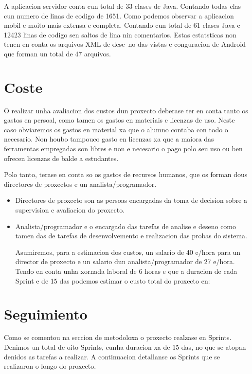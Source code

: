 A aplicacion servidor conta cun total de 33 clases de Java. Contando todas elas cun
numero de linas de codigo de 1651.
Como podemos observar a aplicacion mobil e moito mais extensa e completa. Contando
cun total de 61 clases Java e 12423 linas de codigo sen saltos de lina nin comentarios. Estas
estatsticas non tenen en conta os arquivos XML de dese~no das vistas e conguracion de
Android que forman un total de 47 arquivos.


\section{Coste}
O
realizar unha avaliacion dos custos dun proxecto deberase ter en conta tanto os gastos
en persoal, como tamen os gastos en materiais e licenzas de uso. Neste caso obviaremos os
gastos en material xa que o alumno contaba con todo o necesario. Non houbo tampouco
gasto en licenzas xa que a maiora das ferramentas empregadas son libres e non e necesario
o pago polo seu uso ou ben ofrecen licenzas de balde a estudantes.


Polo tanto, terase en conta so os gastos de recursos humanos, que os forman dous
directores de proxectos e un analista/programador.


\begin{itemize}
\item Directores de proxecto son as persoas encargadas da toma de decision sobre a
supervision e avaliacion do proxecto.

\item Analista/programador e o encargado das tarefas de analise e deseno como tamen
das de tarefas de desenvolvemento e realizacion das probas do sistema.


Asumiremos, para a estimacion dos custos, un salario de 40 e/hora para un director
de proxecto e un salario dun analista/programador de 27 e/hora. Tendo en conta unha
xornada laboral de 6 horas e que a duracion de cada Sprint e de 15 das podemos estimar
o custo total do proxecto en:
\end{itemize}
\section{Seguimiento}
Como se comentou na seccion de metodoloxa o proxecto realzase en Sprints. Denimos
un total de oito Sprints, cunha duracion xa de 15 das, no que se atopan denidos
as tarefas a realizar. A continuacion detallanse os Sprints que se realizaron o longo do
proxecto.
